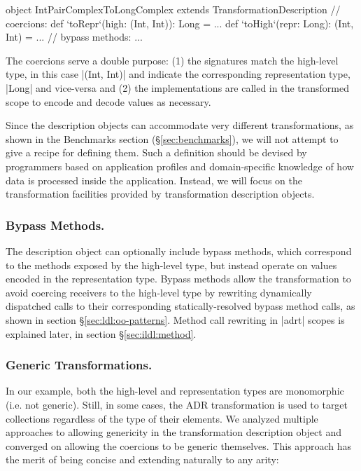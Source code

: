 \begin{lstlisting-nobreak}
object IntPairComplexToLongComplex
          extends TransformationDescription {
  // coercions:
  def `toRepr`(high: (Int, Int)): Long = ...
  def `toHigh`(repr: Long): (Int, Int) = ...
  // bypass methods:
  ...
}
\end{lstlisting-nobreak}

The coercions serve a double purpose: (1) the signatures match the high-level type, in this case |(Int, Int)| and indicate the corresponding representation type, |Long| and vice-versa and (2) the implementations are called in the transformed scope to encode and decode values as necessary.

Since the description objects can accommodate very different transformations, as shown in the Benchmarks section (\S\ref{sec:benchmarks}), we will not attempt to give a recipe for defining them. Such a definition should be devised by programmers based on application profiles and domain-specific knowledge of how data is processed inside the application. Instead, we will focus on the transformation facilities provided by transformation description objects.

\subsubsection{Bypass Methods.} The description object can optionally include bypass methods, which correspond to the methods exposed by the high-level type, but instead operate on values encoded in the representation type. Bypass methods allow the transformation to avoid coercing receivers to the high-level type by rewriting dynamically dispatched calls to their corresponding statically-resolved bypass method calls, as shown in section \S\ref{sec:ldl:oo-patterns}. Method call rewriting in |adrt| scopes is explained later, in section \S\ref{sec:ildl:method}.

\subsubsection{Generic Transformations.} In our example, both the high-level and representation types are monomorphic (i.e. not generic). Still, in some cases, the ADR transformation is used to target collections regardless of the type of their elements. We analyzed multiple approaches to allowing genericity in the transformation description object and converged on allowing the coercions to be generic themselves. This approach has the merit of being concise and extending naturally to any arity:

